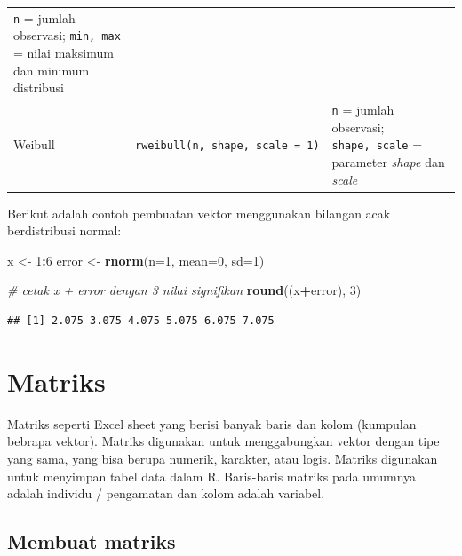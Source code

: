 \documentclass[]{book}
\newenvironment{Shaded}{\begin{snugshade}}{\end{snugshade}}
\newcommand{\CommentTok}[1]{\textcolor[rgb]{0.56,0.35,0.01}{\textit{#1}}}
\newcommand{\DataTypeTok}[1]{\textcolor[rgb]{0.13,0.29,0.53}{#1}}
\newcommand{\DecValTok}[1]{\textcolor[rgb]{0.00,0.00,0.81}{#1}}
\newcommand{\KeywordTok}[1]{\textcolor[rgb]{0.13,0.29,0.53}{\textbf{#1}}}
\newcommand{\NormalTok}[1]{#1}
\newcommand{\OperatorTok}[1]{\textcolor[rgb]{0.81,0.36,0.00}{\textbf{#1}}}
\newcommand{\StringTok}[1]{\textcolor[rgb]{0.31,0.60,0.02}{#1}}
\theoremstyle{definition}
\theoremstyle{definition}
\theoremstyle{definition}
\theoremstyle{remark}
\begin{document}
\begin{longtable}[]{@{}lll@{}}
\begin{minipage}[t]{0.65\columnwidth}
\texttt{n} = jumlah observasi; \texttt{min,\ max} = nilai maksimum dan minimum distribusi\strut
\end{minipage}\tabularnewline
\begin{minipage}[t]{0.07\columnwidth}\raggedright
Weibull\strut
\end{minipage} & \begin{minipage}[t]{0.19\columnwidth}\raggedright
\texttt{rweibull(n,\ shape,\ scale\ =\ 1)}\strut
\end{minipage} & \begin{minipage}[t]{0.65\columnwidth}\raggedright
\texttt{n} = jumlah observasi; \texttt{shape,\ scale} = parameter \emph{shape} dan \emph{scale}\strut
\end{minipage}\tabularnewline
\bottomrule
\end{longtable}

Berikut adalah contoh pembuatan vektor menggunakan bilangan acak berdistribusi normal:

\begin{Shaded}
\begin{Highlighting}[]
\NormalTok{x <-}\StringTok{ }\DecValTok{1}\OperatorTok{:}\DecValTok{6}
\NormalTok{error <-}\StringTok{ }\KeywordTok{rnorm}\NormalTok{(}\DataTypeTok{n=}\DecValTok{1}\NormalTok{, }\DataTypeTok{mean=}\DecValTok{0}\NormalTok{, }\DataTypeTok{sd=}\DecValTok{1}\NormalTok{)}

\CommentTok{# cetak x + error dengan 3 nilai signifikan}
\KeywordTok{round}\NormalTok{((x}\OperatorTok{+}\NormalTok{error), }\DecValTok{3}\NormalTok{)}
\end{Highlighting}
\end{Shaded}

\begin{verbatim}
## [1] 2.075 3.075 4.075 5.075 6.075 7.075
\end{verbatim}

\hypertarget{matriks}{%
\section{Matriks}\label{matriks}}

Matriks seperti Excel sheet yang berisi banyak baris dan kolom (kumpulan bebrapa vektor). Matriks digunakan untuk menggabungkan vektor dengan tipe yang sama, yang bisa berupa numerik, karakter, atau logis. Matriks digunakan untuk menyimpan tabel data dalam R. Baris-baris matriks pada umumnya adalah individu / pengamatan dan kolom adalah variabel.

\hypertarget{creatematrix}{%
\subsection{Membuat matriks}\label{creatematrix}}
\end{document}
